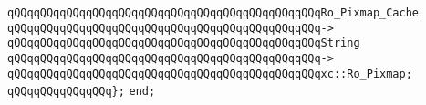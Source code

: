 \verb|qQQqqQQqqQQqqQQqqQQqqQQqqQQqqQQqqQQqqQQqqQQqqQQqRo_Pixmap_Cache|\newline
\verb|qQQqqQQqqQQqqQQqqQQqqQQqqQQqqQQqqQQqqQQqqQQqqQQq->|\newline
\verb|qQQqqQQqqQQqqQQqqQQqqQQqqQQqqQQqqQQqqQQqqQQqqQQqString|\newline
\verb|qQQqqQQqqQQqqQQqqQQqqQQqqQQqqQQqqQQqqQQqqQQqqQQq->|\newline
\verb|qQQqqQQqqQQqqQQqqQQqqQQqqQQqqQQqqQQqqQQqqQQqqQQqxc::Ro_Pixmap;|\newline
\verb|qQQqqQQqqQQqqQQq};|\newline
\newline
\verb|end;|\newline

